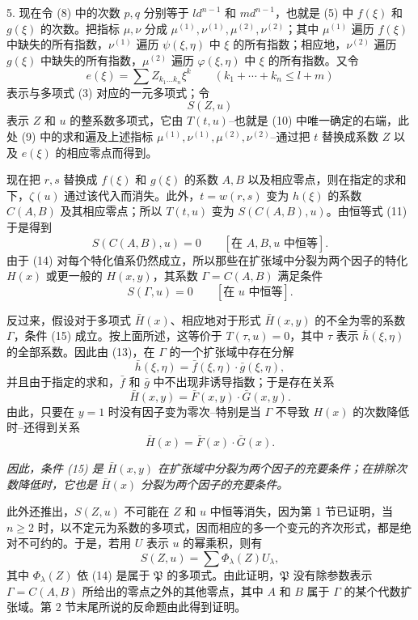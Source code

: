 5. 现在令 (8) 中的次数 $p,q$ 分别等于 $ld^{n-1}$ 和 $md^{n-1}$，也就是 (5) 中 $f(\xi)$ 和 $g(\xi)$ 的次数。把指标 $\mu,\nu$ 分成 $\mu^{(1)},\nu^{(1)},\mu^{(2)},\nu^{(2)}$；其中 $\mu^{(1)}$ 遍历 $f(\xi)$ 中缺失的所有指数，$\nu^{(1)}$ 遍历 $\psi(\xi,\eta)$ 中 $\xi$ 的所有指数；相应地，$\nu^{(2)}$ 遍历 $g(\xi)$ 中缺失的所有指数，$\mu^{(2)}$ 遍历 $\varphi(\xi,\eta)$ 中 $\xi$ 的所有指数。又令
\[
 e(\xi)=\sum Z_{k_1\ldots k_n}\xi^k\qquad(k_1+\cdots+k_n\le l+m)
\]
表示与多项式 (3) 对应的一元多项式；令
\[
 S(Z,u)
\]
表示 $Z$ 和 $u$ 的整系数多项式，它由 $T(t,u)$--也就是 (10) 中唯一确定的右端，此处 (9) 中的求和遍及上述指标 $\mu^{(1)},\nu^{(1)},\mu^{(2)},\nu^{(2)}$--通过把 $t$ 替换成系数 $Z$ 以及 $e(\xi)$ 的相应零点而得到。

现在把 $r,s$ 替换成 $f(\xi)$ 和 $g(\xi)$ 的系数 $A,B$ 以及相应零点，则在指定的求和下，$\zeta(u)$ 通过该代入而消失。此外，$t=w(r,s)$ 变为 $h(\xi)$ 的系数 $C(A,B)$ 及其相应零点；所以 $T(t,u)$ 变为 $S(C(A,B),u)$。由恒等式 (11) 于是得到
\begin{equation}
 S(C(A,B),u)=0\qquad[\text{在 }A,B,u\text{ 中恒等}].
\tag{14}
\end{equation}
由于 (14) 对每个特化值系仍然成立，所以那些在扩张域中分裂为两个因子的特化 $H(x)$ 或更一般的 $H(x,y)$，其系数 $\Gamma=C(A,B)$ 满足条件
\begin{equation}
 S(\Gamma,u)=0\qquad[\text{在 }u\text{ 中恒等}].
\tag{15}
\end{equation}

反过来，假设对于多项式 $\bar H(x)$、相应地对于形式 $\bar H(x,y)$ 的不全为零的系数 $\Gamma$，条件 (15) 成立。按上面所述，这等价于 $T(\tau,u)=0$，其中 $\tau$ 表示 $\bar h(\xi,\eta)$ 的全部系数。因此由 (13)，在 $\Gamma$ 的一个扩张域中存在分解
\[
 \bar h(\xi,\eta)=\bar f(\xi,\eta)\cdot\bar g(\xi,\eta),
\]
并且由于指定的求和，$\bar f$ 和 $\bar g$ 中不出现非诱导指数；于是存在关系
\[
 \bar H(x,y)=\bar F(x,y)\cdot\bar G(x,y).
\]
由此，只要在 $y=1$ 时没有因子变为零次--特别是当 $\Gamma$ 不导致 $H(x)$ 的次数降低时--还得到关系
\[
 \bar H(x)=\bar F(x)\cdot\bar G(x).
\]

\emph{因此，条件 (15) 是 $\bar H(x,y)$ 在扩张域中分裂为两个因子的充要条件；在排除次数降低时，它也是 $\bar H(x)$ 分裂为两个因子的充要条件。}

此外还推出，$S(Z,u)$ 不可能在 $Z$ 和 $u$ 中恒等消失，因为第 1 节已证明，当 $n\ge2$ 时，以不定元为系数的多项式，因而相应的多一个变元的齐次形式，都是绝对不可约的。于是，若用 $U$ 表示 $u$ 的幂乘积，则有
\[
 S(Z,u)=\sum \Phi_\lambda(Z)U_\lambda,
\]
其中 $\Phi_\lambda(Z)$ 依 (14) 是属于 $\mathfrak P$ 的多项式。由此证明，$\mathfrak P$ 没有除参数表示 $\Gamma=C(A,B)$ 所给出的零点之外的其他零点，其中 $A$ 和 $B$ 属于 $\Gamma$ 的某个代数扩张域。第 2 节末尾所说的反命题由此得到证明。

